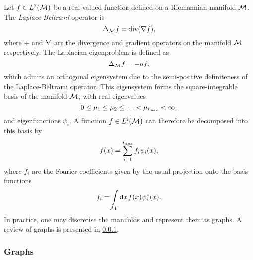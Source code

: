 Let \(f \in L^{2}(\mathcal{M})\) be a real-valued function defined on a Riemannian manifold \(\mathcal{M}{}\).
The \emph{Laplace-Beltrami} operator is
%
\begin{equation}
	\Delta_{\mathcal{M}} f
	= \text{div}(\nabla f),
\end{equation}
%
where \(\div{}\) and \(\nabla\) are the divergence and gradient operators on the manifold \(\mathcal{M}{}\) respectively.
The Laplacian eigenproblem is defined as
%
\begin{equation}
	\Delta_{\mathcal{M}} f
	= -\mu f,
\end{equation}
%
which admits an orthogonal eigensystem due to the semi-positive definiteness of the Laplace-Beltrami operator.
This eigensystem forms the square-integrable basis of the manifold \(\mathcal{M}{}\), with real eigenvalues
%
\begin{equation}
	0 \leq \mu_{1} \leq \mu_{2} \leq \ldots < \mu_{\imax} < \infty, %
\end{equation}
%
and eigenfunctions \(\psi_{i}\).
A function \(f \in L^{2}(\mathcal{M})\) can therefore be decomposed into this basis by
%
\begin{equation}
	f(x)
	= \sum\limits_{i=1}^{i_{\text{max}}} f_{i} \psi_{i}(x),
\end{equation}
%
where \(f_{i}\) are the Fourier coefficients given by the usual projection onto the basis functions
%
\begin{equation}
	f_{i}
	= \int\limits_{\mathcal{M}} \dd{x} f(x) \psi_{i}^{\ast}(x).
\end{equation}
%
In practice, one may discretise the manifolds and represent them as graphs.
A review of graphs is presented in \cref{sec:chapter5_graphs}.

\subsubsection{Graphs}\label{sec:chapter5_graphs}


